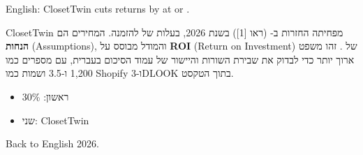 \documentclass{closettwin}
\begin{document}
English: ClosetTwin cuts returns by  at  or .\par
\begin{hebrewpage}
ClosetTwin מפחיתה החזרות ב- (ראו [1]) בשנת 2026, בעלות של  להזמנה. המחירים הם \textbf{הנחות} (Assumptions), והמודל מבוסס על \textbf{ROI} (Return on Investment) של . זהו משפט ארוך יותר כדי לבדוק את שבירת השורות והיישור של עמוד הסיכום בעברית, עם מספרים כמו 1,200 ו-3.5 ושמות כמו Shopify ו-3DLOOK בתוך הטקסט.
\begin{itemize}\item ראשון: 30\% \item שני: ClosetTwin\end{itemize}
\end{hebrewpage}
Back to English 2026.
\end{document}
